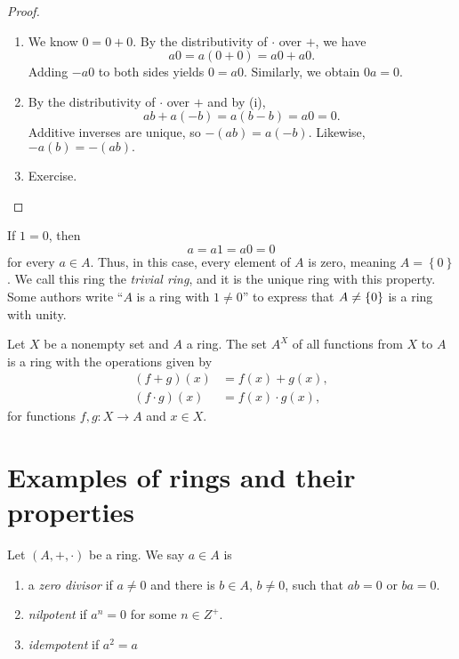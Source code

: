 \documentclass[11pt,a4paper]{article}
\begin{document}
\begin{proof}
\begin{enumerate}[label=(\roman*)]
    \item We know \(0 = 0 + 0\). By the distributivity of \(\cdot\) over \(+\), we have  
    \[
    a 0=a (0+0)=a 0+a 0.
    \]
    Adding \(-a0\) to both sides yields \(0=a0\). 
    Similarly, we obtain \(0a=0\). 
\item By the distributivity of \(\cdot\) over \(+\) and by (i), 
    \[a b+a(-b)=a (b-b) = a0=0.\]
    Additive inverses are unique, so \(-(a b)=a (-b)\). 
    Likewise, \(-a (b)=-(a b).\)
    \item Exercise.
\end{enumerate}
\end{proof}

\begin{rem}
    If \(1 = 0\), then \[a = a 1 = a 0 = 0\] for every \(a\in A\).
    Thus, in this case, every element of \(A\) is zero, meaning \(A = \left\{ 0 \right\}\).
    We call this ring the \textit{trivial ring}, and it is the unique ring with this property.
    Some authors write ``$A$ is a ring with $1\neq 0$'' to express that $A\neq \left\lbrace 0 \right\rbrace$ is a ring with unity.
\end{rem}

\begin{exa}
Let \(X\) be a nonempty set and \(A\) a ring. 
The set \(A^X\) of all functions from \(X\) to  $A$ is  a ring with the operations given by
\begin{align*}
(f+g)(x) &= f(x)+g(x), \\
(f\cdot g)(x) &= f(x)\cdot g(x), 
\end{align*}
for functions \(f,g\colon X\to A\) and \(x\in X\). 
\end{exa}



\section{Examples of rings and their properties}

Let $(A,+,\cdot)$ be a ring. We say \(a\in A\) is 

\begin{enumerate}[label=(\roman*)]
\item a \textit{zero divisor} if \(a\neq 0\) and there is \(b \in A\), \(b\neq 0\), such that \(ab = 0\) or \(ba=0\).
\item \textit{nilpotent}  if \(a^n = 0\) for some \(n\in Z^+\).
\item \textit{idempotent} if \(a^2 = a\)
\end{enumerate}
\end{document}
